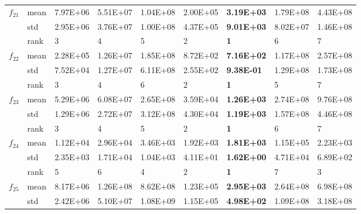 \documentclass[a4paper,13pt,2p]{report}
\begin{document}
\begin{table}[!t]
{\begin{tabular}{|l|l|l|l|l|l|l|l|l|}
\multirow{3}{*}{$f_{21}$} & mean & 7.97E+06 & 5.51E+07 & 1.04E+08 & 2.00E+05          & \textbf{3.19E+03}  & 1.79E+08 & 4.43E+08          \\ \cline{2-9} 
                     & std  & 2.95E+06 & 3.76E+07 & 1.00E+08 & 4.37E+05          & \textbf{9.01E+03}  & 8.02E+07 & 1.46E+08          \\ \cline{2-9} 
                     & rank & 3        & 4        & 5        & 2                 & \textbf{1}         & 6        & 7                 \\ \hline
\multirow{3}{*}{$f_{22}$} & mean & 2.28E+05 & 1.26E+07 & 1.85E+08 & 8.72E+02          & \textbf{7.16E+02}  & 1.17E+08 & 2.57E+08          \\ \cline{2-9} 
                     & std  & 7.52E+04 & 1.27E+07 & 6.11E+08 & 2.55E+02          & \textbf{9.38E-01}  & 1.29E+08 & 1.73E+08          \\ \cline{2-9} 
                     & rank & 3        & 4        & 6        & 2                 & \textbf{1}         & 5        & 7                 \\ \hline
\multirow{3}{*}{$f_{23}$} & mean & 5.29E+06 & 6.08E+07 & 2.65E+08 & 3.59E+04          & \textbf{1.26E+03}  & 2.74E+08 & 9.76E+08          \\ \cline{2-9} 
                     & std  & 1.29E+06 & 2.72E+07 & 3.12E+08 & 4.30E+04          & \textbf{1.19E+03}  & 1.57E+08 & 4.46E+08          \\ \cline{2-9} 
                     & rank & 3        & 4        & 5        & 2                 & \textbf{1}         & 6        & 7                 \\ \hline
                     \multirow{3}{*}{$f_{24}$} & mean & 1.12E+04 & 2.96E+04 & 3.46E+03 & 1.92E+03          & \textbf{1.81E+03}  & 1.15E+05 & 2.23E+03          \\ \cline{2-9} 
                     & std  & 2.35E+03 & 1.71E+04 & 1.04E+03 & 4.11E+01          & \textbf{1.62E+00}  & 4.71E+04 & 6.89E+02          \\ \cline{2-9} 
                     & rank & 5        & 6        & 4        & 2                 & \textbf{1}         & 7        & 3                 \\ \hline
\multirow{3}{*}{$f_{25}$} & mean & 8.17E+06 & 1.26E+08 & 8.62E+08 & 1.23E+05          & \textbf{2.95E+03}  & 2.64E+08 & 6.98E+08          \\ \cline{2-9} 
                     & std  & 2.42E+06 & 5.10E+07 & 1.08E+09 & 1.15E+05          & \textbf{4.98E+02}  & 1.09E+08 & 3.18E+08          \\ \cline{2-9} 

\end{tabular}}
\end{table}
\end{document}
